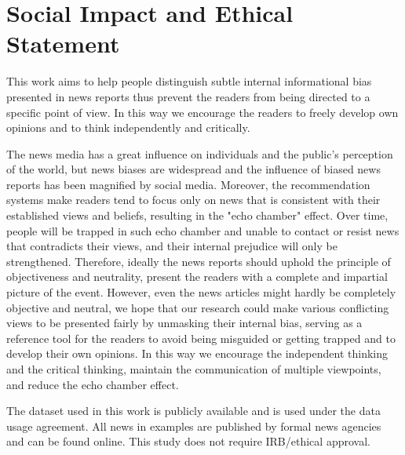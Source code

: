\section{Social Impact and Ethical Statement}


This work aims to help people distinguish subtle internal informational bias presented in news reports thus prevent the readers from being directed to a specific point of view. In this way we encourage the readers to freely develop own opinions and to think independently and critically.

The news media has a great influence on individuals and the public’s perception of the world, but news biases are widespread and the influence of biased news reports has been magnified by social media. Moreover, the recommendation systems make readers tend to focus only on news that is consistent with their established views and beliefs, resulting in the "echo chamber" effect. Over time, people will be trapped in such echo chamber and unable to contact or resist news that contradicts their views, and their internal prejudice will only be strengthened. Therefore, ideally the news reports should uphold the principle of objectiveness and neutrality, present the readers with a complete and impartial picture of the event.  However, even the news articles might hardly be completely objective and neutral, we hope that our research could make various conflicting views to be presented fairly by unmasking their internal bias, serving as a reference tool for the readers to avoid being misguided or getting trapped and to develop their own opinions. In this way we encourage the independent thinking and the critical thinking, maintain the communication of multiple viewpoints, and reduce the echo chamber effect.


The dataset used in this work is publicly available and is used under the data usage agreement. All news in examples are published by formal news agencies and can be found online. This study does not require IRB/ethical approval. 